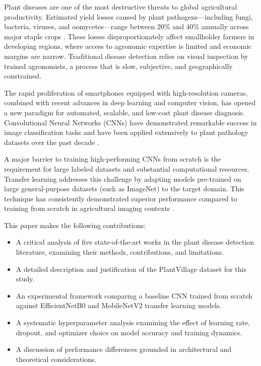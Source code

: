 \documentclass[10pt,twocolumn]{article}
\begin{document}
Plant diseases are one of the most destructive threats to global agricultural productivity. Estimated yield losses caused by plant pathogens—including fungi, bacteria, viruses, and oomycetes—range between 20\% and 40\% annually across major staple crops \cite{Oerke2006}. These losses disproportionately affect smallholder farmers in developing regions, where access to agronomic expertise is limited and economic margins are narrow. Traditional disease detection relies on visual inspection by trained agronomists, a process that is slow, subjective, and geographically constrained.

The rapid proliferation of smartphones equipped with high-resolution cameras, combined with recent advances in deep learning and computer vision, has opened a new paradigm for automated, scalable, and low-cost plant disease diagnosis. Convolutional Neural Networks (CNNs) have demonstrated remarkable success in image classification tasks and have been applied extensively to plant pathology datasets over the past decade \cite{Mohanty2016, Tiwari2021}.

A major barrier to training high-performing CNNs from scratch is the requirement for large labeled datasets and substantial computational resources. Transfer learning addresses this challenge by adapting models pre-trained on large general-purpose datasets (such as ImageNet) to the target domain. This technique has consistently demonstrated superior performance compared to training from scratch in agricultural imaging contexts \cite{Tiwari2021, Ayan2024}.

This paper makes the following contributions:
\begin{itemize}
  \item A critical analysis of five state-of-the-art works in the plant disease detection literature, examining their methods, contributions, and limitations.
  \item A detailed description and justification of the PlantVillage dataset for this study.
  \item An experimental framework comparing a baseline CNN trained from scratch against EfficientNetB0 and MobileNetV2 transfer learning models.
  \item A systematic hyperparameter analysis examining the effect of learning rate, dropout, and optimizer choice on model accuracy and training dynamics.
  \item A discussion of performance differences grounded in architectural and theoretical considerations.
\end{itemize}
\end{document}

